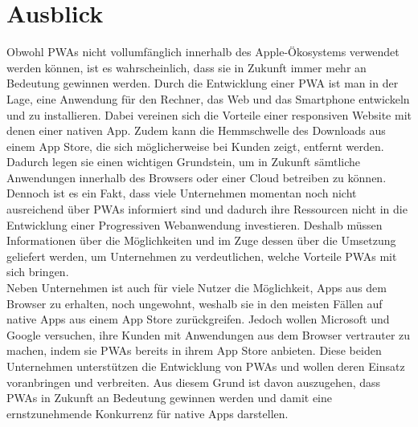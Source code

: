 \chapter{Ausblick}
Obwohl PWAs nicht vollumfänglich innerhalb des Apple-Ökosystems verwendet werden können, ist es wahrscheinlich, dass sie in Zukunft immer mehr an Bedeutung gewinnen werden. Durch die Entwicklung einer PWA ist man in der Lage, eine Anwendung für den Rechner, das Web und das Smartphone entwickeln und zu installieren. Dabei vereinen sich die Vorteile einer responsiven Website mit denen einer nativen App. Zudem kann die Hemmschwelle des Downloads aus einem App Store, die sich möglicherweise bei Kunden zeigt, entfernt werden. Dadurch legen sie einen wichtigen Grundstein, um in Zukunft sämtliche Anwendungen innerhalb des Browsers oder einer Cloud betreiben zu können.\\
Dennoch ist es ein Fakt, dass viele Unternehmen momentan noch nicht ausreichend über PWAs informiert sind und dadurch ihre Ressourcen nicht in die Entwicklung einer Progressiven Webanwendung investieren. Deshalb müssen Informationen über die Möglichkeiten und im Zuge dessen über die Umsetzung geliefert werden, um Unternehmen zu verdeutlichen, welche Vorteile PWAs mit sich bringen.\\
Neben Unternehmen ist auch für viele Nutzer die Möglichkeit, Apps aus dem Browser zu erhalten, noch ungewohnt, weshalb sie in den meisten Fällen auf native Apps aus einem App Store zurückgreifen. Jedoch wollen Microsoft und Google versuchen, ihre Kunden mit Anwendungen aus dem Browser vertrauter zu machen, indem sie PWAs bereits in ihrem App Store anbieten. Diese beiden Unternehmen unterstützen die Entwicklung von PWAs und wollen deren Einsatz voranbringen und verbreiten. Aus diesem Grund ist davon auszugehen, dass PWAs in Zukunft an Bedeutung gewinnen werden und damit eine ernstzunehmende Konkurrenz für native Apps darstellen. 
